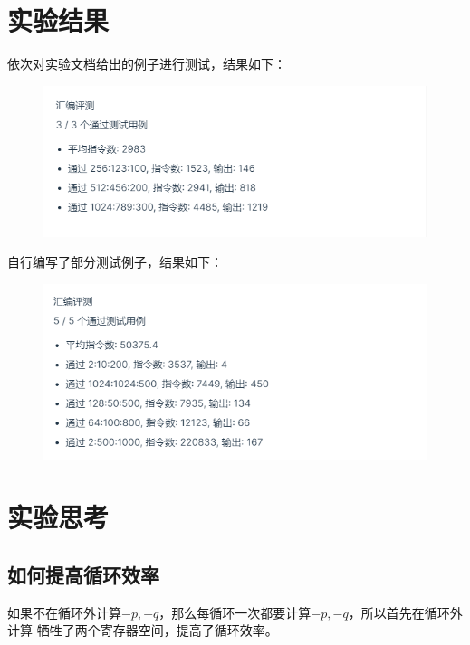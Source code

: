 \documentclass[12pt, a4paper, oneside]{ctexart}
\begin{document}
\section*{实验结果}
依次对实验文档给出的例子进行测试，结果如下：
\begin{figure}[H]
    \centering
    \includegraphics[scale=0.8]{Output1.png}
\end{figure}
自行编写了部分测试例子，结果如下：
\begin{figure}[H]
    \centering
    \includegraphics[scale=0.8]{Output2.png}
\end{figure}

\section*{实验思考}
\subsection*{如何提高循环效率}
    如果不在循环外计算$-p,-q$，那么每循环一次都要计算$-p,-q$，所以首先在循环外计算
    牺牲了两个寄存器空间，提高了循环效率。
\end{document}
